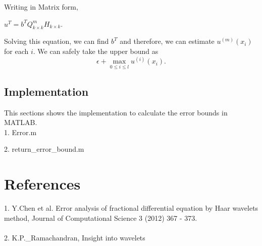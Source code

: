 Writing in Matrix form,

$u^T =b^T Q_{k \times k}^m H_{k \times k}$.

Solving this equation, we can find $b^T$ and therefore, we can estimate $u^{(m)}(x_i)$ for each $i$. We can safely take the upper bound as 
\begin{equation*}
\epsilon + \max_{0 \leq i \leq l}u^{(i)}(x_i).
\end{equation*}

\subsection{Implementation}
This sections shows the implementation to calculate the error bounds in MATLAB. \\
1. Error.m
 {\selectfont \footnotesize{}}
 
 2. return\_error\_bound.m
  
 {\fontsize{7pt}{7.5pt}\selectfont }

  \section{References}
  
  1. Y.Chen et al. Error analysis of fractional differential equation by Haar wavelets method, Journal of Computational Science 3 (2012) 367 - 373. \\~\\
  2. K.P.\_Ramachandran, Insight into wavelets
